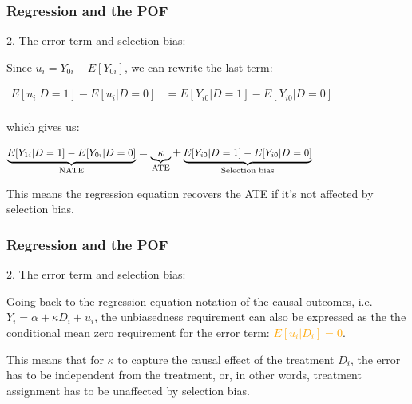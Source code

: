 \documentclass[12pt,english,dvipsnames,aspectratio=169,handout]{beamer}\usepackage[]{graphicx}\usepackage[]{xcolor}
\begin{document}
\begin{frame}
\frametitle{Regression and the POF}

\begin{flushleft}
2. The error term and selection bias:
\end{flushleft}

Since $u_i = Y_{0i} - E[Y_{0i}]$, we can rewrite the last term:

{\centering
  $ \displaystyle
    \begin{aligned} 
    E[u_i|D = 1] - E[u_i|D = 0] &= E[Y_{i0}|D = 1] - E[Y_{i0}|D = 0] \\
    \end{aligned}
  $ 
\par}  

\begin{flushleft}
which gives us:
\end{flushleft}

{\centering
  $ \displaystyle
    \begin{aligned} 
\small \underbrace{E[Y_{1i}|D = 1] - E[Y_{0i}|D = 0]}_{\textrm{NATE}} &= \small\underbrace{\kappa}_{\textrm{ATE}} + \underbrace{E[Y_{i0}|D = 1] - E[Y_{i0}|D = 0]}_{\textrm{Selection bias}}\\
    \end{aligned}
  $ 
\par}
\vspace{3mm}
This means the regression equation recovers the ATE if it's not affected by selection bias.

\end{frame}


\begin{frame}
\frametitle{Regression and the POF}

2. The error term and selection bias:

Going back to the regression equation notation of the causal outcomes, i.e.\  $Y_i = \alpha + \kappa D_i + u_i$, the unbiasedness requirement can also be expressed as the the conditional mean zero
  requirement for the error term: \textcolor{orange}{$E[u_i|D_i] = 0$}. 
  
  This means that for $\kappa$ to capture the causal effect of the treatment $D_i$, the error has to be independent from the treatment, or, in other words, treatment assignment has to be unaffected by selection bias.

\end{frame}
\end{document}

